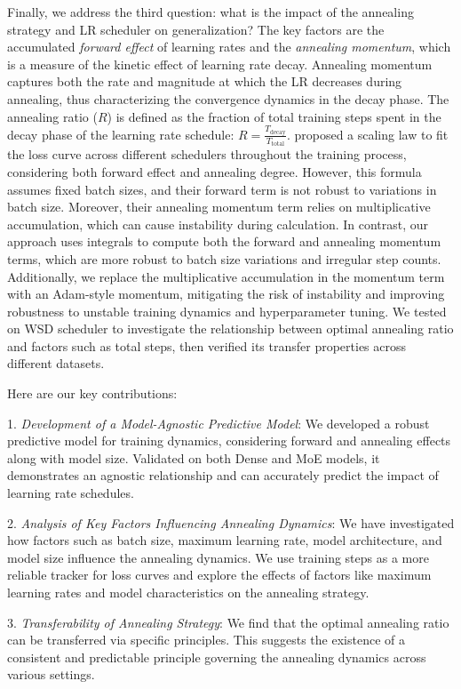 \documentclass[letterpaper]{article} %
\begin{document}
Finally, we address the third question: what is the impact of the annealing strategy and LR scheduler on generalization? The key factors are the accumulated \textit{forward effect} of learning rates and the \textit{annealing momentum}, which is a measure of the kinetic effect of learning rate decay. Annealing momentum captures both the rate and magnitude at which the LR decreases during annealing, thus characterizing the convergence dynamics in the decay phase. The annealing ratio (\( R \)) is defined as the fraction of total training steps spent in the decay phase of the learning rate schedule: \(  R = \frac{T_{\text{decay}}}{T_{\text{total}}} \).  \citet{tissue2024scaling} proposed a scaling law to fit the loss curve across different schedulers throughout the training process, considering both forward effect and annealing degree. However, this formula assumes fixed batch sizes, and their forward term is not robust to variations in batch size. Moreover, their annealing momentum term relies on multiplicative accumulation, which can cause instability during calculation. In contrast, our approach uses integrals to compute both the forward and annealing momentum terms, which are more robust to batch size variations and irregular step counts. Additionally, we replace the multiplicative accumulation in the momentum term with an Adam-style momentum, mitigating the risk of instability and improving robustness to unstable training dynamics and hyperparameter tuning. We tested on WSD scheduler to investigate the relationship between optimal annealing ratio and factors such as total steps, then verified its transfer properties across different datasets.


Here are our key contributions:

1. \textit{Development of a Model-Agnostic Predictive Model}: We developed a robust predictive model for training dynamics, considering forward and annealing effects along with model size. Validated on both Dense and MoE models, it demonstrates an agnostic relationship and can accurately predict the impact of learning rate schedules.

2. \textit{Analysis of Key Factors Influencing Annealing Dynamics}: We have investigated how factors such as batch size, maximum learning rate, model architecture, and model size influence the annealing dynamics. We use training steps as a more reliable tracker for loss curves and explore the effects of factors like maximum learning rates and model characteristics on the annealing strategy.

3. \textit{Transferability of Annealing Strategy}: We find that the optimal annealing ratio can be transferred via specific principles. This suggests the existence of a consistent and predictable principle governing the annealing dynamics across various settings.
\end{document}
